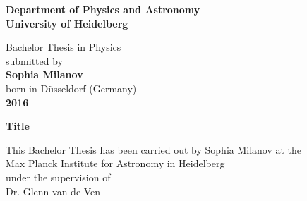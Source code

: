 \begin{titlepage}
\begin{center}
 
\Large\textbf{Department of Physics and Astronomy\\
University of Heidelberg}

\vspace{16cm}

\normalsize
Bachelor Thesis in Physics\\
submitted by \\
\vspace{0.5cm}
\Large\textbf{Sophia Milanov}\\
\normalsize
\vspace{0.5cm}
born in Düsseldorf (Germany)\\
\vspace{0.5cm}
\Large\textbf{2016}
\normalsize

\newpage




\Large\textbf{Title}

\vspace{18cm}

\normalsize
This Bachelor Thesis has been carried out by Sophia Milanov at the\\
Max Planck Institute for Astronomy in Heidelberg\\
under the supervision of\\
Dr. Glenn van de Ven

\vfill
\end{center}

\end{titlepage}
